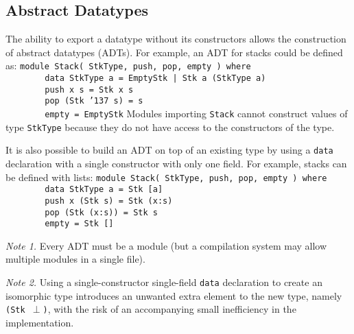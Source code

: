 \subsection{Abstract Datatypes}
\label{abstract-types}

The ability to export a datatype without its constructors
allows the construction of abstract datatypes (ADTs).  For example,
an ADT for stacks could be defined as:
\bprog
\mbox{\tt module\ Stack(\ StkType,\ push,\ pop,\ empty\ )\ where}\\
\mbox{\tt \ \ \ \ \ \ \ \ data\ StkType\ a\ =\ EmptyStk\ |\ Stk\ a\ (StkType\ a)}\\
\mbox{\tt \ \ \ \ \ \ \ \ push\ x\ s\ =\ Stk\ x\ s}\\
\mbox{\tt \ \ \ \ \ \ \ \ pop\ (Stk\ {\char'137}\ s)\ =\ s}\\
\mbox{\tt \ \ \ \ \ \ \ \ empty\ =\ EmptyStk}
\eprog
Modules importing \mbox{\tt Stack} cannot construct values of type \mbox{\tt StkType}
because they do not have access to the constructors of the type.

It is also possible to build an ADT on top of an existing type by
using a \mbox{\tt data} declaration with a single constructor with only one
field.  For example, stacks can be defined with lists:
\bprog
\mbox{\tt module\ Stack(\ StkType,\ push,\ pop,\ empty\ )\ where}\\
\mbox{\tt \ \ \ \ \ \ \ \ data\ StkType\ a\ =\ Stk\ [a]}\\
\mbox{\tt \ \ \ \ \ \ \ \ push\ x\ (Stk\ s)\ =\ Stk\ (x:s)}\\
\mbox{\tt \ \ \ \ \ \ \ \ pop\ (Stk\ (x:s))\ =\ Stk\ s}\\
\mbox{\tt \ \ \ \ \ \ \ \ empty\ =\ Stk\ []}
\eprogNoSkip

{\em Note 1.} Every ADT must be a module (but a
\Haskell{} compilation system may allow multiple modules in a single file).


{\em Note 2.} Using a single-constructor single-field \mbox{\tt data}
declaration to create an isomorphic type introduces an unwanted extra
element to the new type, namely \mbox{\mbox{\tt (Stk\ }$\perp$\mbox{\tt )}}, with the
risk of an accompanying small inefficiency in the implementation.  


